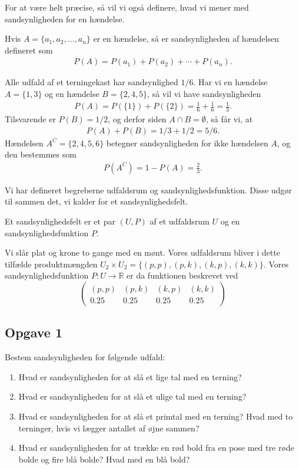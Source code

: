 For at være helt præcise, så vil vi også definere, hvad vi mener med sandsynligheden for en hændelse.
\begin{defn}
	Hvis $A = \{a_1, a_2, \hdots, a_n\}$ er en hændelse, så er sandsynligheden af hændelsen defineret som
	\begin{align*}
		P(A) = P(a_1) + P(a_2) + \cdots + P(a_n).
	\end{align*}	 
\end{defn}

\begin{exa}
Alle udfald af et terningekast har sandsynlighed $1/6$. Har vi en hændelse $A= \{1,3\}$ og en hændelse $B= \{2,4,5\}$, så vil vi have sandsynligheden
\begin{align*}
P(A) = P(\{1\}) + P(\{2\}) =  \frac{1}{6} + \frac{1}{6} = \frac{1}{3}.
\end{align*}
Tilsvarende er $P(B) = 1/2$, og derfor siden $A \cap B = \emptyset$, så får vi, at
\begin{align*}
P(A)+P(B) = 1/3+1/2 = 5/6.
\end{align*}
Hændelsen $A^C=\{2,4,5,6\}$ betegner sandsynligheden for ikke hændelsen $A$, og den bestemmes som
\begin{align*}
P(A^C) = 1-P(A) = \frac{2}{3}.
\end{align*}  
\end{exa}

Vi har defineret begreberne udfaldsrum og sandsynlighedsfunktion. Disse udgør til sammen det, vi kalder for et sandsynlighedsfelt. 
\begin{defn}[Sandsynlighedsfelt]
	Et sandsynlighedsfelt er et par $(U,P)$ af et udfaldsrum $U$ og en sandsynlighedsfunktion $P$. 
\end{defn}

\begin{exa}
	Vi slår plat og krone to gange med en mønt. Vores udfaldsrum bliver i dette tilfælde produktmængden $U_2 \times U_2 = \{(p,p), (p,k), (k,p), (k,k) \}$.
	Vores sandsynlighedsfunktion $P: U \to \mathbb{R}$ er da funktionen beskrevet ved
	$$	
		\begin{pmatrix}
			(p,p) & (p,k) & (k,p) & (k,k) \\
			0.25 & 0.25 & 0.25 & 0.25
		\end{pmatrix}
	$$
\end{exa}


\subsection*{Opgave 1}
Bestem sandsynligheden for følgende udfald:
\begin{enumerate}[label=\roman*)]
\item Hvad er sandsynligheden for at slå et lige tal med en terning?
\item Hvad er sandsynligheden for at slå et ulige tal med en terning?
\item Hvad er sandsynligheden for at slå et primtal med en terning? Hvad med to terninger, hvis vi lægger antallet af øjne sammen?
\item Hvad er sandsynligheden for at trække en rød bold fra en pose med tre røde bolde og fire blå bolde? Hvad med en blå bold?
\end{enumerate}

